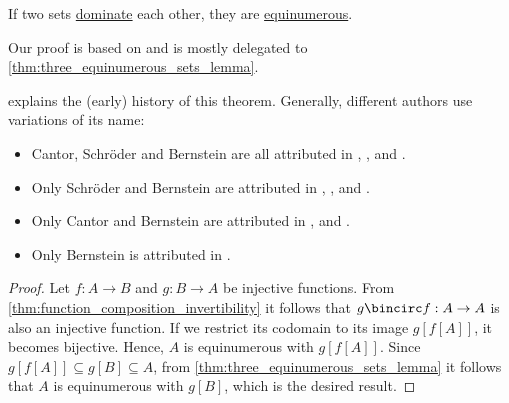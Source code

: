 \begin{theorem}\label{thm:cantor_schroder_bernstein_theorem}
  If two sets \hyperref[def:set_domination]{dominate} each other, they are \hyperref[def:equinumerosity]{equinumerous}.
\end{theorem}
\begin{comments}
  \item Our proof is based on \cite[156]{КолмогоровДрагалин2006ЛогикаДополнительныеГлавы} and is mostly delegated to \cref{thm:three_equinumerous_sets_lemma}.

  \item \Textcite[147]{Enderton1977SetTheory} explains the (early) history of this theorem. Generally, different authors use variations of its name:
  \begin{itemize}
    \item Cantor, Schr\"oder and Bernstein are all attributed in
    \cite[3]{Harzheim2005OrderedSets},
    \cite[thm. 2.22]{Гуров2013ТеорияРешёток},
    \cite[156]{КолмогоровДрагалин2006ЛогикаДополнительныеГлавы} and
    \cite[thm. 8.7.3]{Тыртышников2017ОсновыАлгебры}.

    \item Only Schr\"oder and Bernstein are attributed in
    \cite[thm. I.10.2]{Kunen2013SetTheory},
    \cite[thm. 6.4.4]{Hinman2005Logic},
    \cite[147]{Enderton1977SetTheory} and
    \cite[thm. 2.5.3]{Rosen2019DiscreteMathematics}.

    \item Only Cantor and Bernstein are attributed in
    \cite[thm. 3.2]{Jech2006SetTheory},
    \cite[4]{Engelking1989GeneralTopology} and
    \cite[15]{Willard2004GeneralTopology}.

    \item Only Bernstein is attributed in
    \cite[prop. 4.23(d)]{Mendelson2015Logic}.
  \end{itemize}
\end{comments}
\begin{proof}
  Let \( f: A \to B \) and \( g: B \to A \) be injective functions. From \cref{thm:function_composition_invertibility} it follows that \( g \bincirc f: A \to A \) is also an injective function. If we restrict its codomain to its image \( g[f[A]] \), it becomes bijective. Hence, \( A \) is equinumerous with \( g[f[A]] \). Since \( g[f[A]] \subseteq g[B] \subseteq A \), from \cref{thm:three_equinumerous_sets_lemma} it follows that \( A \) is equinumerous with \( g[B] \), which is the desired result.
\end{proof}

